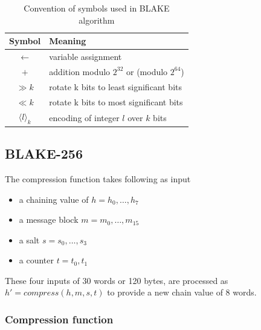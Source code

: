 \begin{table}[h]
  \begin{center}
    \begin{tabular}{ c l } \hline
      Symbol                 & Meaning \\ \hline
      $\gets$                    & variable assignment \\
      $+$                    & addition modulo $2^{32}$ or (modulo $2^{64}$) \\
      $\gg k$                  & rotate k bits to least significant bits \\
      $\ll k$                  & rotate k bits to most significant bits \\
      $\langle l \rangle_{k}$ & encoding of integer $l$ over $k$ bits \\ \hline
    \end{tabular}
    \caption{Convention of symbols used in BLAKE algorithm}
  \end{center}
\end{table}

\subsection{ BLAKE-256 }

The compression function takes following as input
\begin{itemize}
  \item a chaining value of $h = h_{0},\dots, h_{7}$
  \item a message block $m = m_{0},\dots, m_{15}$
  \item a salt $s = s_{0},\dots, s_{3}$
  \item a counter $t = t_{0}, t_{1}$
\end{itemize}
These four inputs of 30 words or 120 bytes, are processed as $h' = compress(h, m, s, t)$ to provide a new
chain value of 8 words.

  \subsubsection{Compression function}

